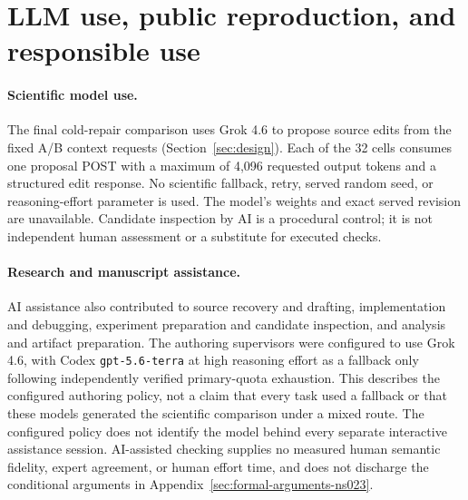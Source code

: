 \section{LLM use, public reproduction, and responsible use}
\label{sec:ns024-disclosures}

\paragraph{Scientific model use.}
The final cold-repair comparison uses Grok 4.6 to propose source edits from
the fixed A/B context requests (Section~\ref{sec:design}). Each of the 32 cells
consumes one proposal POST with a maximum of 4,096 requested output tokens and
a structured edit response. No scientific fallback, retry, served random seed,
or reasoning-effort parameter is used. The model's weights and exact served
revision are unavailable. Candidate inspection by AI is a procedural control;
it is not independent human assessment or a substitute for executed checks.

\paragraph{Research and manuscript assistance.}
AI assistance also contributed to source recovery and drafting, implementation
and debugging, experiment preparation and candidate inspection, and analysis
and artifact preparation. The authoring supervisors were configured to use
Grok 4.6, with Codex \texttt{gpt-5.6-terra} at high reasoning effort as a fallback
only following independently verified primary-quota exhaustion. This describes
the configured authoring policy, not a claim that every task used a fallback or
that these models generated the scientific comparison under a mixed route.
The configured policy does not identify the model behind every separate
interactive assistance session. AI-assisted checking supplies no measured
human semantic fidelity, expert agreement, or human effort time, and does not
discharge the conditional arguments in Appendix~\ref{sec:formal-arguments-ns023}.

